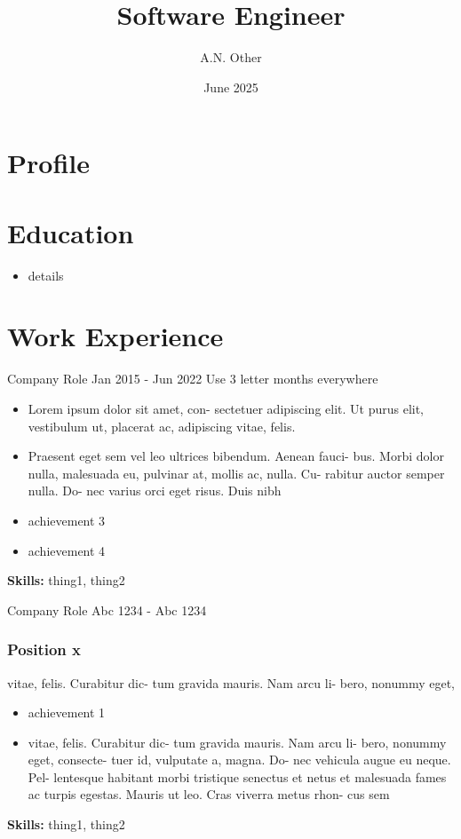 \documentclass{smart-cv}
\author{A.N. Other}
\title{Software Engineer}
\date{June 2025}
\begin{document}
  \begin{two-col}
    {
      \section*{Profile}

      \lipsum[1]

      \section{Education}

      \begin{itemize}
        \item details
      \end{itemize}
    }

    \section{Work Experience}

    \begin{job}
      {Company}
      {Role}
      {Jan 2015 - Jun 2022}
      Use 3 letter months everywhere
      \begin{itemize}
        \item Lorem ipsum dolor sit amet, con- sectetuer adipiscing elit. Ut
          purus elit, vestibulum ut, placerat ac, adipiscing vitae, felis.
        \item Praesent eget sem vel leo ultrices bibendum. Aenean fauci- bus.
          Morbi dolor nulla, malesuada eu, pulvinar at, mollis ac, nulla. Cu-
          rabitur auctor semper nulla. Do- nec varius orci eget risus. Duis
          nibh
        \item achievement 3
        \item achievement 4
      \end{itemize}
      \textbf{Skills:} thing1, thing2
    \end{job}

    \begin{job}
      {Company}
      {Role}
      {Abc 1234 - Abc 1234}

      \subsubsection{Position x} vitae, felis. Curabitur dic- tum gravida
      mauris. Nam arcu li- bero, nonummy eget,
      \begin{itemize}
        \item achievement 1
        \item vitae, felis. Curabitur dic- tum gravida mauris. Nam arcu li-
          bero, nonummy eget, consecte- tuer id, vulputate a, magna. Do- nec
          vehicula augue eu neque. Pel- lentesque habitant morbi tristique
          senectus et netus et malesuada fames ac turpis egestas. Mauris ut
          leo. Cras viverra metus rhon- cus sem
      \end{itemize}
      \textbf{Skills:} thing1, thing2
    \end{job}


\end{two-col}
\end{document}
